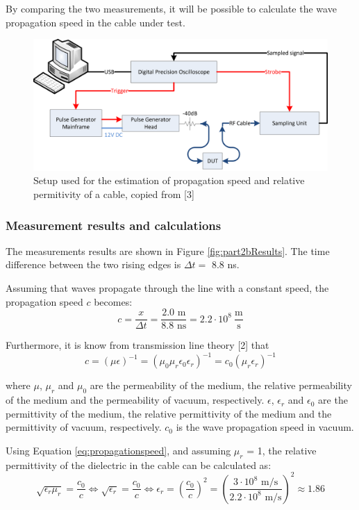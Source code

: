 \documentclass[11pt,a4paper]{article}
\begin{document}
By comparing the two measurements, it will be possible to calculate the wave propagation speed in the cable under test.

\begin{figure}
\includegraphics[scale=1]{opstelling2b.png}
\caption{Setup used for the estimation of propagation speed and relative permitivity of a cable, copied from [3]}\label{fig:opstelling2b}
\end{figure}

\subsubsection{Measurement results and calculations}
The measurements results are shown in Figure \ref{fig:part2bResults}. The time difference between the two rising edges is $\Delta t = $ 8.8 ns.

Assuming that waves propagate through the line with a constant speed, the propagation speed $c$ becomes:
\begin{equation}
c = \frac{x}{\Delta t} = \frac{2.0 \text{ m}}{8.8 \text{ ns}} = 2.2 \cdot{10^8} \ \frac{\text{m}}{\text{s}}
\end{equation}

Furthermore, it is know from transmission line theory [2] that 
\begin{equation}\label{eq:propagationspeed}
c = (\mu\epsilon)^{-1} = (\mu_0\mu_r\epsilon_0\epsilon_r)^{-1} = c_0(\mu_r\epsilon_r)^{-1}
\end{equation}

where $\mu$, $\mu_r$ and  $\mu_0$ are the permeability of the medium, the relative permeability of the medium and the  permeability of vacuum, respectively. $\epsilon$, $\epsilon_r$ and  $\epsilon_0$ are the permittivity of the medium, the relative permittivity of the medium and the  permittivity of vacuum, respectively. $c_0$ is the wave propagation speed in vacuum.

Using Equation \ref{eq:propagationspeed}, and assuming $\mu_r$ = 1, the relative permittivity of the dielectric in the cable can be calculated as:
\begin{equation}
\sqrt{\epsilon_r\mu_r} = \frac{c_0}{c} \Leftrightarrow
\sqrt{\epsilon_r} = \frac{c_0}{c} \Leftrightarrow
\epsilon_r = \left(\frac{c_0}{c}\right)^2 = \left(\frac{3 \cdot 10^8 \text{ m/s}}{2.2 \cdot 10^8 \text{ m/s}}\right)^2 \approx 1.86
\end{equation}
\end{document}
